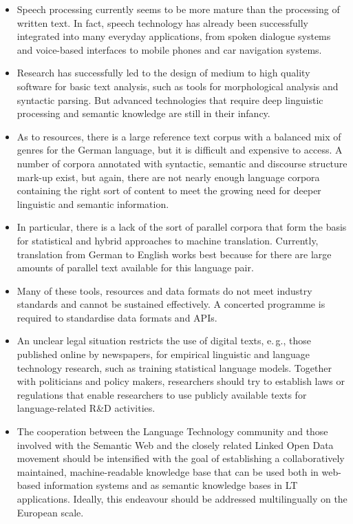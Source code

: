 \begin{multicols}{2}
\begin{itemize}
\item Speech processing currently seems to be more mature than the processing of written text. In fact, speech technology has already been successfully integrated into many everyday applications, from spoken dialogue systems and voice-based interfaces to mobile phones and car navigation systems. 
\item Research has successfully led to the design of medium to high quality software for basic text analysis, such as tools for morphological analysis and syntactic parsing. But advanced technologies that require deep linguistic processing and semantic knowledge are still in their infancy. 
\item As to resources, there is a large reference text corpus with a balanced mix of genres for the German language, but it is difficult and expensive to access. A number of corpora annotated with syntactic, semantic and discourse structure mark-up exist, but again, there are not nearly enough language corpora containing the right sort of content to meet the growing need for deeper linguistic and semantic information. 
\item In particular, there is a lack of the sort of parallel corpora that form the basis for statistical and hybrid approaches to machine translation. Currently, translation from German to English works best because for there are large amounts of parallel text available for this language pair. 
\item Many of these tools, resources and data formats do not meet industry standards and cannot be sustained effectively. A concerted programme is required to standardise data formats and APIs.
\item An unclear legal situation restricts the use of digital texts, e.\,g., those published online by newspapers, for empirical linguistic and language technology research, such as training statistical language models. Together with politicians and policy makers, researchers should try to establish laws or regulations that enable researchers to use publicly available texts for language-related R\&D activities.
\item The cooperation between the Language Technology community and those involved with the Semantic Web and the closely related Linked Open Data movement should be intensified with the goal of establishing a collaboratively maintained, machine-readable knowledge base that can be used both in web-based information systems and as semantic knowledge bases in LT applications. Ideally, this endeavour should be addressed multilingually on the European scale.
\end{itemize}


\end{multicols}
